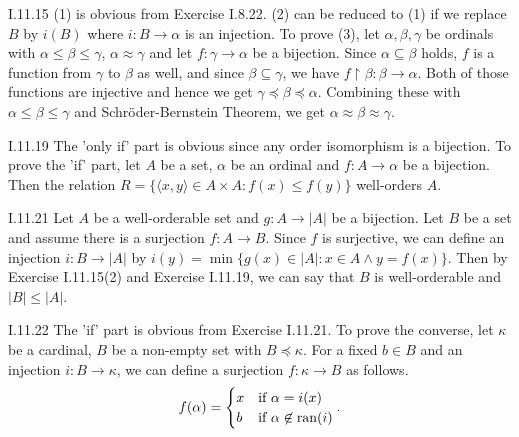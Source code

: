 \documentclass[12pt]{article}
\begin{document}
\begin{customthm}{I.11.15}
  (1) is obvious from Exercise I.8.22. (2) can be reduced to (1) if we replace $B$ by $i(B)$ where $i:B\rightarrow\alpha$ is an injection. To prove (3), let $\alpha,\beta,\gamma$ be ordinals with $\alpha\leq\beta\leq\gamma$, $\alpha\approx\gamma$ and let $f:\gamma\rightarrow\alpha$ be a bijection. Since $\alpha\subseteq\beta$ holds, $f$ is a function from $\gamma$ to $\beta$ as well, and since $\beta\subseteq\gamma$, we have $f\upharpoonright\beta:\beta\rightarrow\alpha$. Both of those functions are injective and hence we get $\gamma\preccurlyeq\beta\preccurlyeq\alpha$. Combining these with $\alpha\leq\beta\leq\gamma$ and Schröder-Bernstein Theorem, we get $\alpha\approx\beta\approx\gamma$.
\end{customthm}

\begin{customthm}{I.11.19}
  The 'only if' part is obvious since any order isomorphism is a bijection. To prove the 'if' part, let $A$ be a set, $\alpha$ be an ordinal and $f:A\rightarrow\alpha$ be a bijection. Then the relation $R=\{\langle x,y\rangle\in A\times A:f(x)\leq f(y)\}$ well-orders $A$.
\end{customthm}

\begin{customthm}{I.11.21}
  Let $A$ be a well-orderable set and $g:A\rightarrow|A|$ be a bijection. Let $B$ be a set and assume there is a surjection $f:A\rightarrow B$.  Since $f$ is surjective, we can define an injection $i:B\rightarrow|A|$ by $i(y)=\min\{g(x)\in|A|:x\in A\wedge y=f(x)\}$. Then by Exercise I.11.15(2) and Exercise I.11.19, we can say that $B$ is well-orderable and $|B|\leq|A|$.
\end{customthm}

\begin{customthm}{I.11.22}
  The 'if' part is obvious from Exercise I.11.21. To prove the converse, let $\kappa$ be a cardinal, $B$ be a non-empty set with $B\preccurlyeq\kappa$. For a fixed $b\in B$ and an injection $i:B\rightarrow\kappa$, we can define a surjection $f:\kappa\rightarrow B$ as follows.
  \[
    f(\alpha)=
    \begin{cases}
      x & \text{if } \alpha=i(x) \\
      b & \text{if } \alpha\not\in\mathop{\mathrm{ran}}(i)
    \end{cases}.
  \]
\end{customthm}
\end{document}
